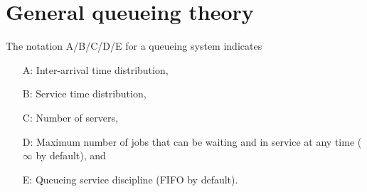 \documentclass[a4paper,10pt,english]{article}
\begin{document}

\section{General queueing theory}
The notation A/B/C/D/E for a queueing system indicates 
\begin{itemize}
\item[A:] Inter-arrival time distribution, 
\item[B:] Service time distribution, 
\item[C:] Number of servers, 
\item[D:] Maximum number of jobs that can be waiting and in service at any time ($\infty$ by default), and 
\item[E:] Queueing service discipline (FIFO by default). 
\end{itemize}
\end{document}
